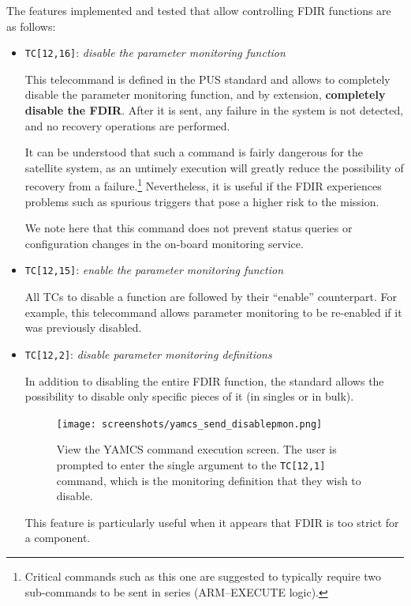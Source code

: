 \documentclass[a4paper,nobib,final]{tufte-book}
\begin{document}
The features implemented and tested that allow controlling \acs{FDIR} functions are as follows:
\begin{itemize}
	\item \texttt{TC[12,16]}: \emph{disable the parameter monitoring function}
	
	This telecommand is defined in the \acs{PUS} standard and allows to completely disable the parameter monitoring function, and by extension, \textbf{completely disable the \acs{FDIR}}. After it is sent, any failure in the system is not detected, and no recovery operations are performed.
	
	It can be understood that such a command is fairly dangerous for the satellite system, as an untimely execution will greatly reduce the possibility of recovery from a failure.\footnote{Critical commands such as this one are suggested to typically require two sub-commands to be sent in series (ARM--EXECUTE logic).} Nevertheless, it is useful if the \acs{FDIR} experiences problems such as spurious triggers that pose a higher risk to the mission.
	
	We note here that this command does not prevent status queries or configuration changes in the on-board monitoring service.
	
	\item \texttt{TC[12,15]}: \emph{enable the parameter monitoring function}
	
	All \acsp{TC} to disable a function are followed by their ``enable'' counterpart. For example, this telecommand allows parameter monitoring to be re-enabled if it was previously disabled.

	\item \texttt{TC[12,2]}: \emph{disable parameter monitoring definitions}
	
	In addition to disabling the entire \acs{FDIR} function, the standard allows the possibility to disable only specific pieces of it (in singles or in bulk).
	
	\begin{figure}[h]
		\texttt{[image: screenshots/yamcs\_send\_disablepmon.png]}
		\caption[View the \acs{YAMCS} command execution screen]{View the \acs{YAMCS} command execution screen. The user is prompted to enter the single argument to the \texttt{TC[12,1]} command, which is the monitoring definition that they wish to disable.}
		\label{fig:yamcssenddisablepmon}
	\end{figure}
	
	This feature is particularly useful when it appears that \acs{FDIR} is too strict for a component.
	

\end{itemize}
\end{document}
